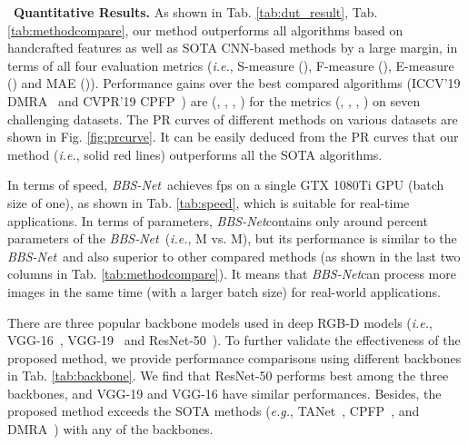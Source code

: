 \documentclass[journal]{IEEEtran}
\newcommand{\tabref}[1]{Tab. \ref{#1}}
\newcommand{\figref}[1]{Fig. \ref{#1}}
\newcommand{\myPara}[1]{\vspace{10pt}\noindent~\textbf{#1} \quad}
\def\ie{\emph{i.e.}}
\def\eg{\emph{e.g.}}
\def\ourmodel{\emph{BBS-Net}}
\begin{document}
\myPara{\textbf{Quantitative Results.}} As shown in \tabref{tab:dut_result}, \tabref{tab:methodcompare}, our method outperforms all algorithms based on handcrafted features as well as SOTA CNN-based methods by a large margin, in terms of all four evaluation metrics (\ie, S-measure (), F-measure (), E-measure () and MAE ()).
Performance gains over the best compared algorithms (ICCV'19 DMRA~\cite{piao2019DMRA} and CVPR'19 CPFP~\cite{zhao2019CPFP}) are (, , , ) for the metrics (, , , ) on seven challenging datasets.
The PR curves of different methods on various datasets are shown in \figref{fig:prcurve}.
It can be easily deduced from the PR curves that our method (\ie, solid red lines) outperforms all the SOTA algorithms.
\par
In terms of speed, \ourmodel~achieves  fps on a single GTX 1080Ti GPU (batch size of one), as shown in \tabref{tab:speed}, which is suitable for real-time applications.
In terms of parameters, \ourmodel contains only around  percent parameters of the \ourmodel~(\ie, M vs. M), but its performance is similar to the \ourmodel~and also superior to other compared methods (as shown in the last two columns in \tabref{tab:methodcompare}).
It means that \ourmodel can process more images in the same time (with a larger batch size) for real-world applications.
\par
There are three popular backbone models used in deep RGB-D models (\ie, VGG-16~\cite{simonyan2014vgg}, VGG-19~\cite{simonyan2014vgg} and ResNet-50~\cite{He2016resnet}).
To further validate the effectiveness of the proposed method, we provide performance comparisons using different backbones in \tabref{tab:backbone}.
We find that ResNet-50 performs best among the three backbones, and VGG-19 and VGG-16 have similar performances.
Besides, the proposed method exceeds the SOTA methods (\eg, TANet~\cite{chen2019TANet}, CPFP~\cite{zhao2019CPFP}, and DMRA~\cite{piao2019DMRA}) with any of the backbones.
\end{document}
